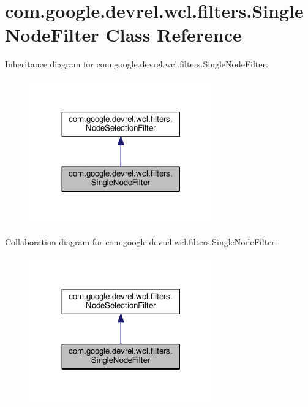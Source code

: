\hypertarget{classcom_1_1google_1_1devrel_1_1wcl_1_1filters_1_1SingleNodeFilter}{}\section{com.\+google.\+devrel.\+wcl.\+filters.\+Single\+Node\+Filter Class Reference}
\label{classcom_1_1google_1_1devrel_1_1wcl_1_1filters_1_1SingleNodeFilter}


Inheritance diagram for com.\+google.\+devrel.\+wcl.\+filters.\+Single\+Node\+Filter\+:\nopagebreak
\begin{figure}[H]
\begin{center}
\leavevmode
\includegraphics[width=224pt]{df/d3c/classcom_1_1google_1_1devrel_1_1wcl_1_1filters_1_1SingleNodeFilter__inherit__graph}
\end{center}
\end{figure}


Collaboration diagram for com.\+google.\+devrel.\+wcl.\+filters.\+Single\+Node\+Filter\+:\nopagebreak
\begin{figure}[H]
\begin{center}
\leavevmode
\includegraphics[width=224pt]{d7/daa/classcom_1_1google_1_1devrel_1_1wcl_1_1filters_1_1SingleNodeFilter__coll__graph}
\end{center}
\end{figure}

